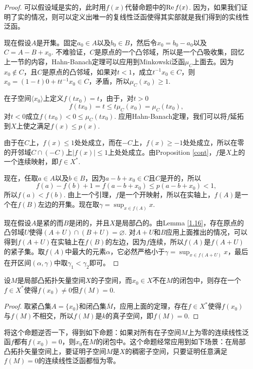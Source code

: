 \begin{proof}
	可以假设域是实的，此时用$f(x)$代替命题中的$\operatorname{Re} f(x)$. 因为，如果我们证明了实的情况，则可以定义出唯一的复线性泛函使得其实部就是我们得到的实线性泛函。

	现在假设$A$是开集。固定$a_0\in A$以及$b_0\in B$，然后令$x_0=b_0-a_0$以及$C=A-B+x_0$. 不难验证，$C$是原点的一个凸邻域，所以是一个凸吸收集，回忆上一节的内容，Hahn-Banach定理可以应用到Minkowski泛函$\mu_C$上面去。因为$x_0\not\in C$，且$C$是原点的凸邻域，如果对$t<1$，成立$t^{-1}x_0\in C$，则$x_0=(1-t)0+tt^{-1}x_0\in C$，矛盾，所以$\mu_C(x_0)\geq 1$.

	在子空间$\langle x_0\rangle$上定义$f(t x_0)=t$，由于，对$t>0$
	\[
	f(tx_0)=t\leq t \mu_C(x_0)=\mu_C(tx_0),
	\]
	对$t<0$成立$f(tx_0)<0\leq \mu_C(tx_0)$. 应用Hahn-Banach定理，我们可以将$f$延拓到$X$上使之满足$f(x)\leq p(x)$.

	由于在$C$上，$f(x)\leq 1$处处成立，而在$-C$上，$f(x)\geq -1$处处成立，所以在零的开邻域$C\cap (-C)$上$|f(x)|\leq 1$上处处成立。由Proposition \ref{cont}，$f$是$X$上的一个连续映射，即$f\in X^*$.

	现在，任取$a\in A$以及$b\in B$，因为$a-b+x_0\in C$且$C$是开的，所以
	\[
	f(a)-f(b)+1=f(a-b+x_0)\leq p(a-b+x_0)<1,
	\]
	所以$f(a)<f(b)$. 由上一个引理，$f$是一个开映射，所以在实轴上，$f(A)$是一个在$f(B)$左边的开集。现在取$\gamma=\sup_{x\in f(A)}x$.

	现在假设$A$是紧的而$B$是闭的，并且$X$是局部凸的。由Lemma \ref{1.16}，存在原点的凸邻域$U$使得$(A+U)\cap (B+U)=\varnothing$. 对$A+U$和$B$应用上面推出的情况，可以得到$f(A+U)$在实轴上在$f(B)$的左边，因为$f$连续，所以$f(A)$是$f(A+U)$的紧子集。取$f(A)$中最大的元素$\alpha$，它必然严格小于$\gamma=\sup_{x\in f(A+U)}x$，最后在开区间$(\alpha,\gamma)$中取$\gamma_1<\gamma_2$即可。
\end{proof}

\begin{pro}[点与子空间的分离]
设$M$是局部凸拓扑矢量空间$X$的子空间，而$x_0\in X$不在$M$的闭包中，则存在一个$f\in X^*$使得$f(x_0)\neq 0$但$f(M)=0$.
\end{pro}

\begin{proof}
取紧凸集$A=\{x_0\}$和闭凸集$\overline{M}$，应用上面的定理，存在$f\in X^*$使得$f(x_0)$与$f(M)$不相交，所以$f(M)$是$k$的真子空间，即$f(M)=0$.
\end{proof}

将这个命题逆否一下，得到如下命题：如果对所有在子空间$M$上为零的连续线性泛函$f$都有$f(x_0)=0$，则$x_0$在$M$的闭包中。这个命题经常应用到如下场景：在局部凸拓扑矢量空间上，要证明子空间$M$是$X$的稠密子空间，只要证明任意满足$f(M)=0$的连续线性泛函都恒为零。

